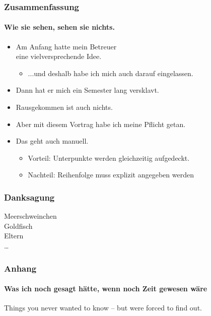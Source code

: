\documentclass[utf8]{beamer}
\begin{document}
\begin{frame}
\frametitle{Zusammenfassung}
\framesubtitle{Wie sie sehen, sehen sie nichts.}


\begin{itemize}[<+->]
\item Am Anfang hatte mein Betreuer\\ eine vielversprechende Idee.
\begin{itemize}
\item ...und deshalb habe ich mich auch darauf eingelassen.
\end{itemize}

\item Dann hat er mich ein Semester lang versklavt.

\item Rausgekommen ist auch nichts.

\item Aber mit diesem Vortrag habe ich meine Pflicht getan.
\end{itemize}

\begin{itemize}
\item<6-> Das geht auch manuell.
\begin{itemize}
\item Vorteil: Unterpunkte werden gleichzeitig aufgedeckt.
\item Nachteil: Reihenfolge muss \alert<7->{explizit angegeben} werden
\end{itemize}
\end{itemize}

\end{frame}


\begin{frame}
\frametitle{Danksagung}

Meerschweinchen\\
Goldfisch\\
Eltern\\
\ldots

\vspace*{\fill}

\begin{center}
\end{center}

\end{frame}

\setcounter{finalframe}{\value{framenumber}}
\appendix


\begin{frame}
\frametitle{Anhang}
\framesubtitle{Was ich noch gesagt hätte, wenn noch Zeit gewesen wäre}

Things you never wanted to know -- but were forced to find out.

\end{frame}

\setcounter{framenumber}{\value{finalframe}}
\end{document}
